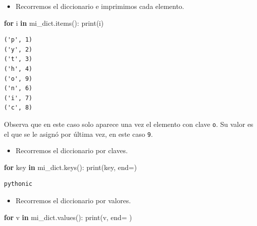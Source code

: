 \documentclass[
  spanish,
  letterpaper,
]{scrbook}
\newenvironment{Shaded}{\begin{snugshade}}{\end{snugshade}}
\newcommand{\BuiltInTok}[1]{\textcolor[rgb]{0.00,0.23,0.31}{#1}}
\newcommand{\ControlFlowTok}[1]{\textcolor[rgb]{0.00,0.23,0.31}{\textbf{#1}}}
\newcommand{\KeywordTok}[1]{\textcolor[rgb]{0.00,0.23,0.31}{\textbf{#1}}}
\newcommand{\NormalTok}[1]{\textcolor[rgb]{0.00,0.23,0.31}{#1}}
\newcommand{\OperatorTok}[1]{\textcolor[rgb]{0.37,0.37,0.37}{#1}}
\newcommand{\StringTok}[1]{\textcolor[rgb]{0.13,0.47,0.30}{#1}}
\providecommand{\tightlist}{%
  \setlength{\itemsep}{0pt}\setlength{\parskip}{0pt}}
\theoremstyle{definition}
\theoremstyle{remark}
\begin{document}
\begin{itemize}
\tightlist
\item
  Recorremos el diccionario e imprimimos cada elemento.
\end{itemize}

\begin{Shaded}
\begin{Highlighting}[]
\ControlFlowTok{for}\NormalTok{ i }\KeywordTok{in}\NormalTok{ mi\_dict.items():}
    \BuiltInTok{print}\NormalTok{(i)}
\end{Highlighting}
\end{Shaded}

\begin{verbatim}
('p', 1)
('y', 2)
('t', 3)
('h', 4)
('o', 9)
('n', 6)
('i', 7)
('c', 8)
\end{verbatim}

Observa que en este caso solo aparece una vez el elemento con clave
\texttt{o}. Su valor es el que se le asignó por última vez, en este caso
\texttt{9}.

\begin{itemize}
\tightlist
\item
  Recorremos el diccionario por claves.
\end{itemize}

\begin{Shaded}
\begin{Highlighting}[]
\ControlFlowTok{for}\NormalTok{ key }\KeywordTok{in}\NormalTok{ mi\_dict.keys():}
    \BuiltInTok{print}\NormalTok{(key, end}\OperatorTok{=}\StringTok{\textquotesingle{}\textquotesingle{}}\NormalTok{)}
\end{Highlighting}
\end{Shaded}

\begin{verbatim}
pythonic
\end{verbatim}

\begin{itemize}
\tightlist
\item
  Recorremos el diccionario por valores.
\end{itemize}

\begin{Shaded}
\begin{Highlighting}[]
\ControlFlowTok{for}\NormalTok{ v }\KeywordTok{in}\NormalTok{ mi\_dict.values():}
    \BuiltInTok{print}\NormalTok{(v, end}\OperatorTok{=}\StringTok{\textquotesingle{} \textquotesingle{}}\NormalTok{)}
\end{Highlighting}
\end{Shaded}
\end{document}
